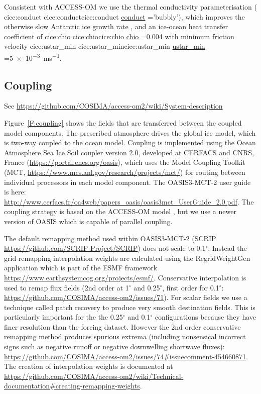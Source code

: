 \documentclass[11pt, a4paper]{article}
\makeatletter
\newcommand{\WARNING}{\marginpar{\textcolor{red}{\danger}}\index{Warnings \textcolor{red}{\danger}}}
\newcommand*{\make@hex@label}[1]{%
  \def\hex@label{#1}%
  \@onelevel@sanitize\hex@label
  \EdefEscapeHex\hex@label{\hex@label}%
}
\newcommand*{\hexhyperlink}[2]{%
  \make@hex@label{#1}%
  \hyperlink{\hex@label}{#2}%
}
\newcommand{\cicelink}[2]{\hexhyperlink{cice:#2}{#1}}
\newcommand{\paramsty}[1]{\textsf{#1}}
\newcommand{\cice}[1]{\paramsty{\cicelink{#1}{#1}}\index{\paramsty{#1}}}
\makeatother
\begin{document}
Consistent with ACCESS-OM \citep[][table~2]{BiMarslandUotilaOFarrellFiedlerSullivanGriffiesZhouHirst2013a}
we use the \citet{PringleEickenTrodahlBackstrom2007a} thermal conductivity parameterisation (\cice{conduct}='bubbly'), which improves the otherwise slow Antarctic ice growth rate \citep{Hunke2010a}, and an ice-ocean heat transfer coefficient of \cice{chio}=0.004 with minimum friction velocity \cice{ustar_min}=\SI{5e-3}{ms^{-1}}.


\subsection{Coupling}
See \url{https://github.com/COSIMA/access-om2/wiki/System-description}

Figure~\ref{F:coupling} shows the fields that are transferred between the coupled model components.
The prescribed atmosphere drives the global ice model, which is two-way coupled to the ocean model.
Coupling is implemented using the Ocean Atmosphere Sea Ice Soil \citep[OASIS3-MCT, ][]{ValckeCraigCoquart2015a} coupler version 2.0, developed at CERFACS and CNRS, France (\url{https://portal.enes.org/oasis}), which uses the Model Coupling Toolkit (MCT, \url{https://www.mcs.anl.gov/research/projects/mct/}) for routing between individual processors in each model component.
The OASIS3-MCT-2 user guide is here: \url{http://www.cerfacs.fr/oa4web/papers_oasis/oasis3mct_UserGuide_2.0.pdf}. 
The coupling strategy is based on the ACCESS-OM model \citep{BiMarsland2010a}, but we use a newer version of OASIS which is capable of parallel coupling.

The default remapping method used within OASIS3-MCT-2 (SCRIP \url{https://github.com/SCRIP-Project/SCRIP}) does not scale to 0.1$^\circ$. 
Instead the grid remapping interpolation weights are calculated using the RegridWeightGen application which is part of the ESMF framework \url{https://www.earthsystemcog.org/projects/esmf/}.
Conservative interpolation is used to remap flux fields (2nd order at 1$^\circ$ and 0.25$^\circ$, first order for 0.1$^\circ$: \url{https://github.com/COSIMA/access-om2/issues/71}).
For scalar fields we use a technique called patch recovery \citep{Kritsikis2017, Khoei2007} to produce very smooth destination fields. 
This is particularly important for the the 0.25$^\circ$ and 0.1$^\circ$ configurations because they have finer resolution than the forcing dataset. 
However the 2nd order conservative remapping method produces spurious extrema \WARNING (including nonsensical incorrect signs such as negative runoff or negative downwelling shortwave fluxes): \url{https://github.com/COSIMA/access-om2/issues/74#issuecomment-454660871}.
The creation of interpolation weights is documented at \url{https://github.com/COSIMA/access-om2/wiki/Technical-documentation#creating-remapping-weights}.
\end{document}
